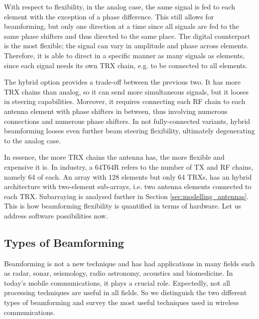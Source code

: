With respect to flexibility, in the analog case, the same signal is fed to each element with the exception of a phase difference. This still allows for beamforming, but only one direction at a time since all signals are fed to the same phase shifters and thus directed to the same place. The digital counterpart is the most flexible; the signal can vary in amplitude and phase across elements. Therefore, it is able to direct in a specific manner as many signals as elements, since each signal needs its own TRX chain, e.g. to be connected to all elements.

The hybrid option provides a trade-off between the previous two. It has more TRX chains than analog, so it can send more simultaneous signals, but it looses in steering capabilities. Moreover, it requires connecting each RF chain to each antenna element with phase shifters in between, thus involving numerous connections and numerous phase shifters. In not fully-connected variants, hybrid beamforming looses even further beam steering flexibility, ultimately degenerating to the analog case.


In essence, the more TRX chains the antenna has, the more flexible and expensive it is. In industry, a 64T64R refers to the number of TX and RF chains, namely 64 of each. An array with 128 elements but only 64 \acsp{TRX}, has an hybrid architecture with two-element sub-arrays, i.e. two antenna elements connected to each TRX. Subarraying is analysed further in Section \ref{sec:modelling_antennas}. This is how beamforming flexibility is quantified in terms of hardware. Let us address software possibilities now.


\subsection*{Types of Beamforming} \label{sec:types_of_beamforming}

Beamforming is not a new technique \cite{6591907} and has had applications in many fields such as radar, sonar, seismology, radio astronomy, acoustics and biomedicine. In today's mobile communications, it plays a crucial role. Expectedly, not all processing techniques are useful in all fields. So we distinguish the two different types of beamforming and survey the most useful techniques used in wireless communications.

